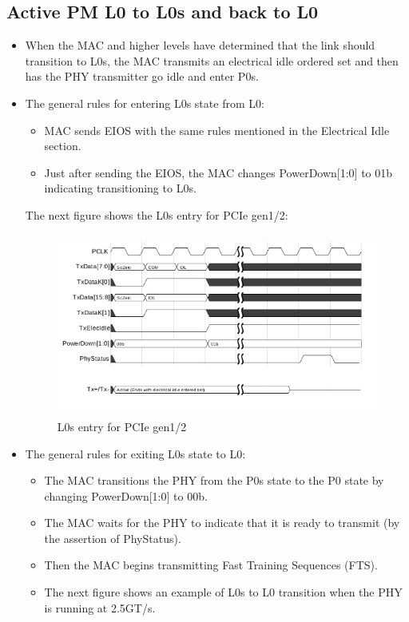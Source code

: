 \subsection{Active PM L0 to L0s and back to L0}  
\begin{itemize}
    \item When the MAC and higher levels have determined that the link should transition to L0s, the MAC transmits an electrical idle ordered set and then has the PHY transmitter go idle and enter P0s.
\item The general rules for entering L0s state from L0:
\begin{itemize}
    \item MAC sends EIOS with the same rules mentioned in the  Electrical Idle section.
\item Just after sending the EIOS, the MAC changes PowerDown[1:0] to 01b indicating transitioning to L0s.
\end{itemize}
The next figure shows the L0s entry for PCIe gen1/2:
\begin{figure}[H]
  \centering
  \includegraphics[width=130mm,height=60mm]{images/clk_diagram/l0.png}
  \caption{L0s entry for PCIe gen1/2}
  \label{lane}
\end{figure}
\item The general rules for exiting L0s state to L0:
\begin{itemize}
    \item The MAC transitions the PHY from the P0s state to the P0 state by changing PowerDown[1:0] to 00b.
\item The MAC waits for the PHY to indicate that it is ready to transmit (by the assertion of PhyStatus).
\item Then the MAC begins transmitting Fast Training Sequences (FTS).

\item The next figure shows an example of L0s to L0 transition when the PHY is running at 2.5GT/s.


\end{itemize}
\end{itemize}
